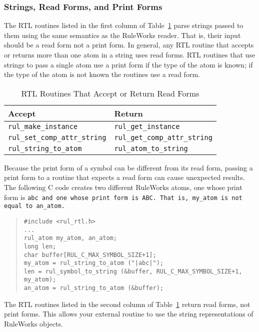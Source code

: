 \subsubsection{Strings, Read Forms, and Print Forms}

The RTL routines listed in the first column of Table~\ref{t:6-11}
parse strings passed to them using the same semantics as the RuleWorks
reader. That is, their input should be a read form not a print
form. In general, any RTL routine that accepts or returns more than
one atom in a string uses read forms. RTL routines that use strings to
pass a single atom use a print form if the type of the atom is known;
if the type of the atom is not known the routines use a read form.

\begin{table}
  \centering
  \begin{tabular}{ll}
    \toprule
    Accept  & Return \\
    \midrule
    \verb|rul_make_instance| & \verb|rul_get_instance| \\
    \verb|rul_set_comp_attr_string| & \verb|rul_get_comp_attr_string| \\
    \verb|rul_string_to_atom| & \verb|rul_atom_to_string| \\
    \bottomrule
  \end{tabular}
  \caption{RTL Routines That Accept or Return Read Forms}
  \label{t:6-11}
\end{table}

Because the print form of a symbol can be different from its read
form, passing a print form to a routine that expects a read form can
cause unexpected results. The following C code creates two different
RuleWorks atoms, one whose print form is \tt{abc} and one whose print
form is \tt{ABC}. That is, \verb|my_atom| is not equal to
\verb|an_atom|.

\begin{quote}
\begin{verbatim}
#include <rul_rtl.h>
...
rul_atom my_atom, an_atom;
long len;
char buffer[RUL_C_MAX_SYMBOL_SIZE+1];
my_atom = rul_string_to_atom ("|abc|");
len = rul_symbol_to_string (&buffer, RUL_C_MAX_SYMBOL_SIZE+1, my_atom);
an_atom = rul_string_to_atom (&buffer);
\end{verbatim}
\end{quote}

The RTL routines listed in the second column of Table~\ref{t:6-11}
return read forms, not print forms. This allows your external routine
to use the string representations of RuleWorks objects.

